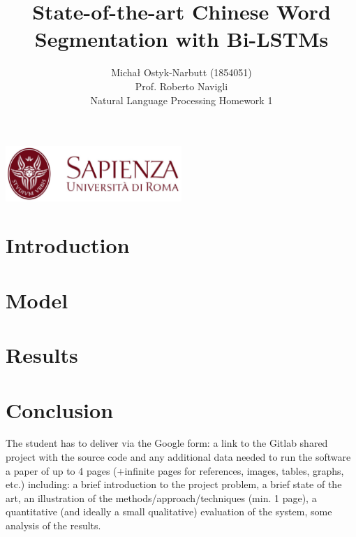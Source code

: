 \documentclass[12pt,a4paper]{article}
\begin{document}
\title{State-of-the-art Chinese Word Segmentation with Bi-LSTMs}
\author{Michał Ostyk-Narbutt (1854051)\\Prof. Roberto Navigli \\ Natural Language Processing Homework 1}

\maketitle


\begin{center}
\includegraphics[width=0.5\textwidth]{img/sapienza_logo.jpg}
\end{center}
\maketitle
\tableofcontents
\clearpage
\section{Introduction}
\section{Model}
\section{Results}
\section{Conclusion}

%
%
The student has to deliver via the Google form:
a link to the Gitlab shared project with the source code and any additional data needed to run the software
a paper of up to 4 pages (+infinite pages for references, images, tables, graphs, etc.) including: a brief introduction to the project problem, a brief state of the art, an illustration of the methods/approach/techniques (min. 1 page), a quantitative (and ideally a small qualitative) evaluation of the system, some analysis of the results.
\\\\\
\end{document}

